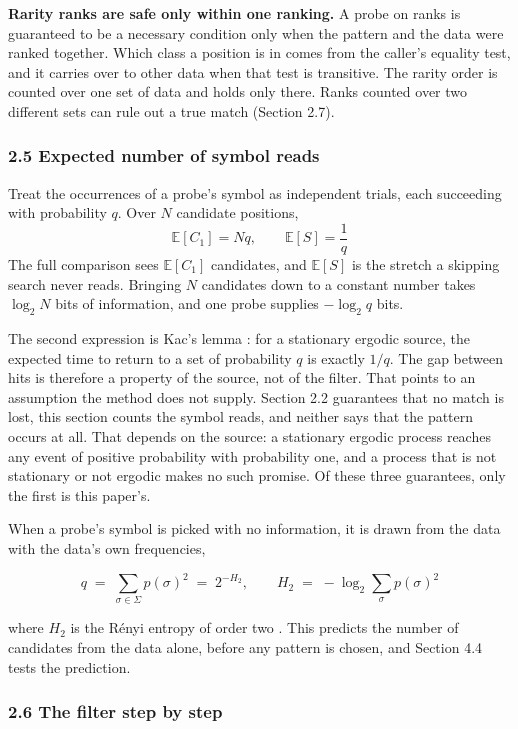 \noindent\textbf{Rarity ranks are safe only within one ranking.} A probe on ranks is guaranteed to be a necessary condition only when the pattern and the data were ranked together. Which class a position is in comes from the caller's equality test, and it carries over to other data when that test is transitive. The rarity order is counted over one set of data and holds only there. Ranks counted over two different sets can rule out a true match (Section 2.7).

\subsubsection{2.5 Expected number of symbol reads}

Treat the occurrences of a probe's symbol as independent trials, each succeeding with probability \(q\). Over \(N\) candidate positions,
\[
  \mathbb{E}[C_1] = N q, \qquad \mathbb{E}[S] = \frac{1}{q}
\]
The full comparison sees \(\mathbb{E}[C_1]\) candidates, and \(\mathbb{E}[S]\) is the stretch a skipping search never reads. Bringing \(N\) candidates down to a constant number takes \(\log_2 N\) bits of information, and one probe supplies \(-\log_2 q\) bits.

The second expression is Kac's lemma \cite{src:Kac}: for a stationary ergodic source, the expected time to return to a set of probability \(q\) is exactly \(1/q\). The gap between hits is therefore a property of the source, not of the filter. That points to an assumption the method does not supply. Section 2.2 guarantees that no match is lost, this section counts the symbol reads, and neither says that the pattern occurs at all. That depends on the source: a stationary ergodic process reaches any event of positive probability with probability one, and a process that is not stationary or not ergodic makes no such promise. Of these three guarantees, only the first is this paper's.

When a probe's symbol is picked with no information, it is drawn from the data with the data's own frequencies,

\[
q \;=\; \sum_{\sigma \in \Sigma} p(\sigma)^2 \;=\; 2^{-H_2}, \qquad
H_2 \;=\; -\log_2 \sum_{\sigma} p(\sigma)^2
\]

where \(H_2\) is the R\'enyi entropy of order two \cite{src:Renyi}. This predicts the number of candidates from the data alone, before any pattern is chosen, and Section 4.4 tests the prediction.

\subsubsection{2.6 The filter step by step}

